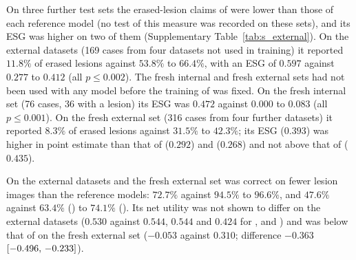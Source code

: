 On three further test sets the erased-lesion claims of \ms{} were lower than those of each reference model (no test of this measure was recorded on these sets), and its ESG was higher on two of them (Supplementary Table~\ref{tab:s_external}).
On the external datasets (169 cases from four datasets not used in training) it reported $11.8\%$ of erased lesions against $53.8\%$ to $66.4\%$, with an ESG of $0.597$ against $0.277$ to $0.412$ (all $p \le 0.002$).
The fresh internal and fresh external sets had not been used with any model before the training of \ms{} was fixed.
On the fresh internal set (76 cases, 36 with a lesion) its ESG was $0.472$ against $0.000$ to $0.083$ (all $p \le 0.001$).
On the fresh external set (316 cases from four further datasets) it reported $8.3\%$ of erased lesions against $31.5\%$ to $42.3\%$; its ESG ($0.393$) was higher in point estimate than that of \opus{} ($0.292$) and \gpt{} ($0.268$) and not above that of \gem{} ($0.435$).

On the external datasets and the fresh external set \ms{} was correct on fewer lesion images than the reference models: $72.7\%$ against $94.5\%$ to $96.6\%$, and $47.6\%$ against $63.4\%$ (\gpt) to $74.1\%$ (\gem).
Its net utility was not shown to differ on the external datasets ($0.530$ against $0.544$, $0.544$ and $0.424$ for \gem, \opus{} and \gpt) and was below that of \gem{} on the fresh external set ($-0.053$ against $0.310$; difference $-0.363$ $[-0.496,\,-0.233]$).

